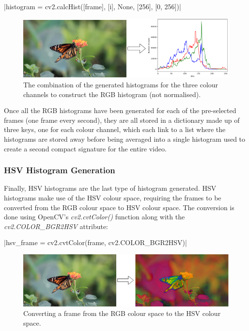 |histogram = cv2.calcHist([frame], [i], None, [256], [0, 256])|

\begin{figure}[h] 
\centerline{\includegraphics[width=\textwidth]{figures/implementation/rgb_not_normalised.png}}
\caption{\label{fig:implementation-rgb_not_normalised}The combination of the generated histograms for the three colour channels to construct the RGB histogram (not normalised).}
\end{figure}

Once all the RGB histograms have been generated for each of the pre-selected frames (one frame every second), they are all stored in a dictionary made up of three keys, one for each colour channel, which each link to a list where the histograms are stored away before being averaged into a single histogram used to create a second compact signature for the entire video. 


\subsubsection{HSV Histogram Generation}

Finally, HSV histograms are the last type of histogram generated. HSV histograms make use of the HSV colour space, requiring the frames to be converted from the RGB colour space to HSV colour space. The conversion is done using OpenCV's \textit{cv2.cvtColor()} function along with the \textit{cv2.COLOR\_BGR2HSV} attribute:

|hsv_frame = cv2.cvtColor(frame, cv2.COLOR_BGR2HSV)|

\begin{figure}[h] 
\centerline{\includegraphics[width=\textwidth]{figures/implementation/rgb_to_hsv.png}}
\caption{\label{fig:greycale_histogram_generation}Converting a frame from the RGB colour space to the HSV colour space.}
\end{figure}

